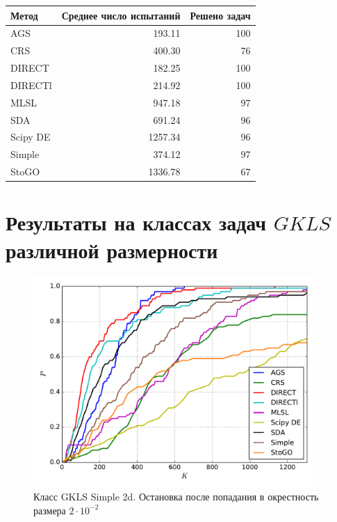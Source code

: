 \documentclass[a4paper]{article}
\begin{document}
\begin{tabular}{lrr}
\hline
 Метод    &   Среднее число испытаний &   Решено задач \\
\hline
 AGS      &                    193.11 &            100 \\
 CRS      &                    400.30 &             76 \\
 DIRECT   &                    182.25 &            100 \\
 DIRECTl  &                    214.92 &            100 \\
 MLSL     &                    947.18 &             97 \\
 SDA      &                    691.24 &             96 \\
 Scipy DE &                   1257.34 &             96 \\
 Simple   &                    374.12 &             97 \\
 StoGO    &                   1336.78 &             67 \\
\hline
\end{tabular}
\section{Результаты на классах задач $GKLS$ различной размерности}

\begin{figure}[H]
  \center
  \includegraphics[width=0.95\textwidth]{../experiments/gklss2d/cmc.pdf}
  \caption{Класс GKLS Simple 2d. Остановка после попадания в окрестность размера $2\cdot10^{-2}$}
  \label{fig:}
\end{figure}
\end{document}
